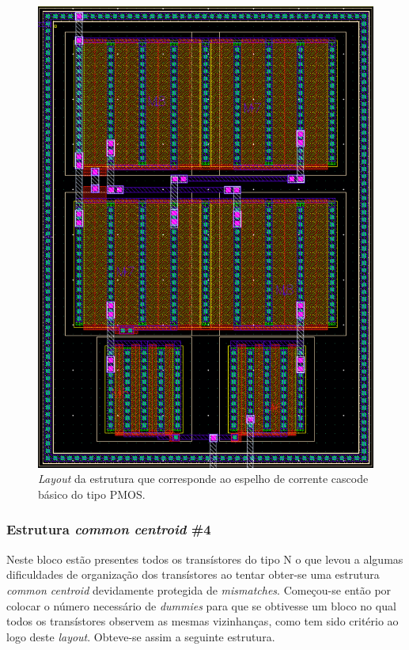 \documentclass[11pt]{article}
\numberwithin{equation}{section}
\begin{document}
\begin{figure}[H]
	\centering
	\includegraphics[keepaspectratio=true, scale=0.57]{exps/layout/espelhodecorrenteamp}
	\vspace{-0.5em}
	\caption{\textit{Layout} da estrutura que corresponde ao espelho de corrente cascode básico do tipo PMOS.}
	\vspace{-0.8em}
\end{figure}

\subsubsection{Estrutura \textit{common centroid} \#4}

Neste bloco estão presentes todos os transístores do tipo N o que levou a algumas dificuldades de organização dos transístores ao tentar obter-se uma estrutura \textit{common centroid} devidamente protegida de \textit{mismatches}. Começou-se então por colocar o número necessário de \textit{dummies} para que se obtivesse um bloco no qual todos os transístores observem as mesmas vizinhanças, como tem sido critério ao logo deste \textit{layout}. Obteve-se assim a seguinte estrutura.
\end{document}
